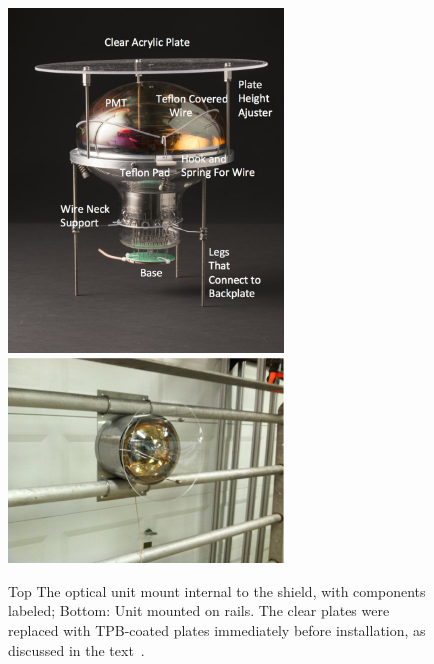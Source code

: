\begin{figure}[t]
\centering	
\includegraphics[width=0.65\textwidth]{./light_figures/mountedpmtlabeled.jpg}
\includegraphics[width=0.65\textwidth]{./light_figures/PMTunit2.pdf}
\caption{Top The optical unit mount internal to the shield, with components labeled; Bottom: Unit mounted on rails.  The clear plates were replaced with TPB-coated plates immediately before \lartpc installation, as discussed in the text~\cite{Briese:2013wua,Katori:2013wqa}.}
\label{fig:unitmodel}
\end{figure}

